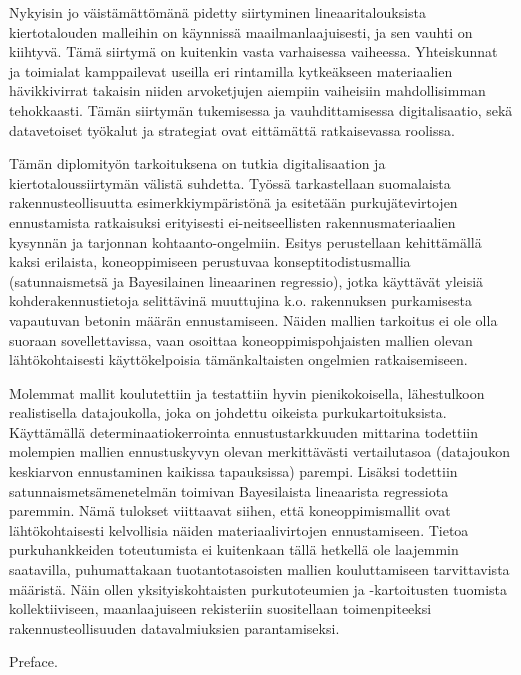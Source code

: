 \documentclass[english, 12pt, a4paper, sci, utf8, a-2b, online]{aaltothesis}
\begin{document}
\begin{abstractpage}[finnish]
  Nykyisin jo väistämättömänä pidetty siirtyminen lineaaritalouksista kiertotalouden malleihin
  on käynnissä maailmanlaajuisesti, ja sen vauhti on kiihtyvä. Tämä siirtymä on kuitenkin vasta
  varhaisessa vaiheessa. Yhteiskunnat ja toimialat kamppailevat useilla eri rintamilla kytkeäkseen
  materiaalien hävikkivirrat takaisin niiden arvoketjujen aiempiin vaiheisiin mahdollisimman tehokkaasti.
  Tämän siirtymän tukemisessa ja vauhdittamisessa digitalisaatio, sekä datavetoiset työkalut
  ja strategiat ovat eittämättä ratkaisevassa roolissa.

  Tämän diplomityön tarkoituksena on tutkia digitalisaation ja kiertotaloussiirtymän välistä suhdetta.
  Työssä tarkastellaan suomalaista rakennusteollisuutta esimerkkiympäristönä ja esitetään purkujätevirtojen
  ennustamista ratkaisuksi erityisesti ei-neitseellisten rakennusmateriaalien kysynnän ja tarjonnan kohtaanto-ongelmiin.
  Esitys perustellaan kehittämällä kaksi erilaista, koneoppimiseen perustuvaa konseptitodistusmallia
  (satunnaismetsä ja Bayesilainen lineaarinen regressio), jotka käyttävät yleisiä kohderakennustietoja selittävinä muuttujina
  k.o. rakennuksen purkamisesta vapautuvan betonin määrän ennustamiseen. Näiden mallien tarkoitus ei ole olla suoraan sovellettavissa,
  vaan osoittaa koneoppimispohjaisten mallien olevan lähtökohtaisesti käyttökelpoisia tämänkaltaisten ongelmien ratkaisemiseen.

  Molemmat mallit koulutettiin ja testattiin hyvin pienikokoisella, lähestulkoon realistisella datajoukolla, joka on johdettu
  oikeista purkukartoituksista. Käyttämällä determinaatiokerrointa ennustustarkkuuden mittarina todettiin molempien mallien
  ennustuskyvyn olevan merkittävästi vertailutasoa (datajoukon keskiarvon ennustaminen kaikissa tapauksissa) parempi.
  Lisäksi todettiin satunnaismetsämenetelmän toimivan Bayesilaista lineaarista regressiota paremmin.
  Nämä tulokset viittaavat siihen, että koneoppimismallit ovat lähtökohtaisesti kelvollisia näiden materiaalivirtojen ennustamiseen.
  Tietoa purkuhankkeiden toteutumista ei kuitenkaan tällä hetkellä ole laajemmin saatavilla, puhumattakaan tuotantotasoisten mallien
  kouluttamiseen tarvittavista määristä. Näin ollen yksityiskohtaisten purkutoteumien ja -kartoitusten tuomista kollektiiviseen,
  maanlaajuiseen rekisteriin suositellaan toimenpiteeksi rakennusteollisuuden datavalmiuksien parantamiseksi.
\end{abstractpage}


Preface.
\end{document}
